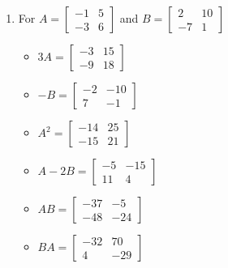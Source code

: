 \begin{enumerate}
\begin{multicols}{3}
\begin{itemize}
\end{itemize}
\end{multicols}



\item For  $A = \left[ \begin{array}{rr} -1 & 5 \\ -3 & 6 \end{array} \right]$ and $B=\left[ \begin{array}{rr} 2 & 10 \\ -7 & 1 \end{array} \right]$

\begin{multicols}{3}
\begin{itemize}
\item  $3A = \left[ \begin{array}{rr} -3 & 15 \\ -9 & 18 \end{array} \right]$

\item $-B = \left[ \begin{array}{rr} -2 & -10 \\ 7 & -1 \end{array} \right]$

\item $A^2 = \left[ \begin{array}{rr} -14 & 25 \\ -15 & 21 \end{array} \right]$

\end{itemize}
\end{multicols}


\begin{multicols}{3}
\begin{itemize}
\item  $A-2B = \left[ \begin{array}{rr} -5 & -15 \\ 11 & 4 \end{array} \right]$

\item $AB = \left[ \begin{array}{rr} -37 & -5 \\ -48 & -24 \end{array} \right]$

\item $BA = \left[ \begin{array}{rr} -32 & 70 \\ 4 & -29 \end{array} \right]$


\end{itemize}
\end{multicols}
\end{enumerate}
